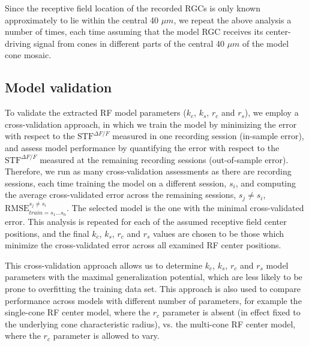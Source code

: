 \documentclass[11pt, oneside]{article}   	%
\begin{document}
Since the receptive field location of the recorded RGCs is only known approximately to lie within the central 40 $\mu m$, we repeat the above analysis a number of times, each time assuming that the model RGC receives its center-driving signal from cones in different parts of the central 40 $\mu m$ of the model cone mosaic. 


\subsection{Model validation}
To validate the extracted RF model parameters ($k_c$, $k_s$, $r_c$ and $r_s$), we employ a cross-validation approach, in which we train the model by minimizing the error with respect to the $\mbox{STF}^{\Delta F / F}$ measured in one recording session (in-sample error), and assess model performance by quantifying the error with respect to the $\mbox{STF}^{\Delta F / F}$ measured at the remaining recording sessions (out-of-sample error). Therefore, we run as many cross-validation assessments as there are recording sessions, each time training the model on a different session, $s_i$, and computing the average cross-validated error across the remaining sessions, $s_j \ne s_i$, $\mbox{RMSE}_{train = s_1\dots s_n}^{s_j \ne s_i}$. The selected model is the one with the minimal  cross-validated error. This analysis is repeated for each of the assumed receptive field center positions, and the final $k_c$, $k_s$, $r_c$ and $r_s$ values are chosen to be those which minimize the cross-validated error across all examined RF center positions.

This cross-validation approach allows us to determine $k_c$, $k_s$, $r_c$ and $r_s$ model parameters with the maximal generalization potential, which are less likely to be prone to overfitting the training data set. This approach is also used to compare performance across models with different number of parameters, for example the single-cone RF center model, where the $r_c$ parameter is absent (in effect fixed to the underlying cone characteristic radius), vs. the multi-cone RF center model, where the $r_c$ parameter is allowed to vary.

\newpage
\end{document}
